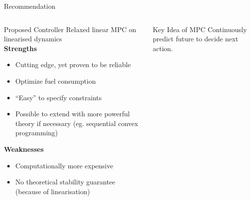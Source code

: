\documentclass[xetex, smaller, aspectratio=43]{beamer}
\begin{document}
\begin{frame}[fragile]{Recommendation}
  \begin{columns}[T]
    \begin{column}{.5\linewidth}
      \begin{block}{Proposed Controller} \small
        Relaxed linear MPC on linearised dynamics \\[.5em]

        \textbf{Strengths}
        \begin{itemize}
          \item Cutting edge, yet proven to be reliable
          \item Optimize fuel consumption
          \item ``Easy'' to specify constraints
          \item Possible to extend with more powerful theory if necessary (eg.
            sequential convex programming)
        \end{itemize}

        \textbf{Weaknesses}
        \begin{itemize}
          \item Computationally more expensive
          \item No theoretical stability guarantee (because of linearisation)
        \end{itemize}
      \end{block}
    \end{column}
    \begin{column}{.5\linewidth}
      \begin{alertblock}{Key Idea of MPC} \small
        Continuously predict future to decide next action.
      \end{alertblock}
      \begin{center}
\end{center}
\end{column}
\end{columns}
\end{frame}
\end{document}
